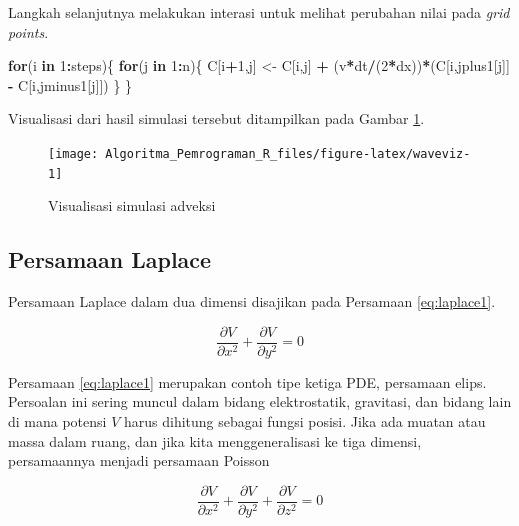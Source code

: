\documentclass[
]{book}
\newenvironment{Shaded}{\begin{snugshade}}{\end{snugshade}}
\newcommand{\ControlFlowTok}[1]{\textcolor[rgb]{0.13,0.29,0.53}{\textbf{#1}}}
\newcommand{\DecValTok}[1]{\textcolor[rgb]{0.00,0.00,0.81}{#1}}
\newcommand{\NormalTok}[1]{#1}
\newcommand{\OtherTok}[1]{\textcolor[rgb]{0.56,0.35,0.01}{#1}}
\newcommand{\SpecialCharTok}[1]{\textcolor[rgb]{0.81,0.36,0.00}{\textbf{#1}}}
\theoremstyle{definition}
\theoremstyle{definition}
\theoremstyle{definition}
\theoremstyle{definition}
\theoremstyle{remark}
\begin{document}
Langkah selanjutnya melakukan interasi untuk melihat perubahan nilai pada \emph{grid points}.

\begin{Shaded}
\begin{Highlighting}[]
\ControlFlowTok{for}\NormalTok{(i }\ControlFlowTok{in} \DecValTok{1}\SpecialCharTok{:}\NormalTok{steps)\{}
  \ControlFlowTok{for}\NormalTok{(j }\ControlFlowTok{in} \DecValTok{1}\SpecialCharTok{:}\NormalTok{n)\{}
\NormalTok{    C[i}\SpecialCharTok{+}\DecValTok{1}\NormalTok{,j] }\OtherTok{\textless{}{-}}\NormalTok{ C[i,j] }\SpecialCharTok{+}\NormalTok{ (v}\SpecialCharTok{*}\NormalTok{dt}\SpecialCharTok{/}\NormalTok{(}\DecValTok{2}\SpecialCharTok{*}\NormalTok{dx))}\SpecialCharTok{*}\NormalTok{(C[i,jplus1[j]] }\SpecialCharTok{{-}}\NormalTok{ C[i,jminus1[j]])}
\NormalTok{  \}}
\NormalTok{\}}
\end{Highlighting}
\end{Shaded}

Visualisasi dari hasil simulasi tersebut ditampilkan pada Gambar \ref{fig:waveviz}.

\begin{figure}

{\centering \texttt{[image: Algoritma\_Pemrograman\_R\_files/figure-latex/waveviz-1]} 

}

\caption{Visualisasi simulasi adveksi}\label{fig:waveviz}
\end{figure}

\hypertarget{laplace}{%
\subsection{Persamaan Laplace}\label{laplace}}

Persamaan Laplace dalam dua dimensi disajikan pada Persamaan \eqref{eq:laplace1}.

\begin{equation}
\frac{\partial V}{\partial x^2}+\frac{\partial V}{\partial y^2}=0
  \label{eq:laplace1}
\end{equation}

Persamaan \eqref{eq:laplace1} merupakan contoh tipe ketiga PDE, persamaan elips. Persoalan ini sering muncul dalam bidang elektrostatik, gravitasi, dan bidang lain di mana potensi \(V\) harus dihitung sebagai fungsi posisi. Jika ada muatan atau massa dalam ruang, dan jika kita menggeneralisasi ke tiga dimensi, persamaannya menjadi persamaan Poisson

\begin{equation}
\frac{\partial V}{\partial x^2}+\frac{\partial V}{\partial y^2}+\frac{\partial V}{\partial z^2}=0
  \label{eq:laplace2}
\end{equation}
\end{document}
